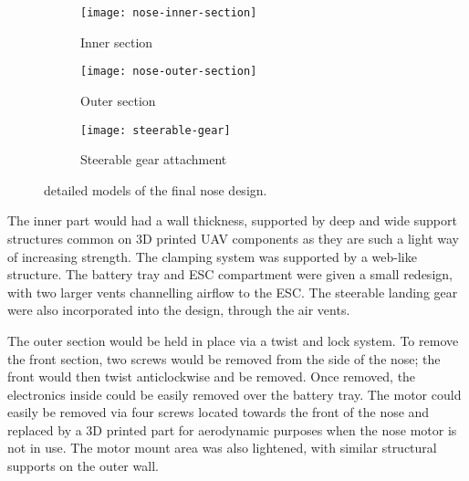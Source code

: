 \documentclass[../../main.tex]{subfiles}
\begin{document}
\begin{figure}[H]
    \centering
    \begin{subfigure}[b]{0.6\columnwidth}
        \centering
        \texttt{[image: nose-inner-section]}
        \caption{Inner section}
        \label{fig:nose-design:inner}
    \end{subfigure}
    
    \begin{subfigure}[b]{0.6\columnwidth}
        \centering
        \texttt{[image: nose-outer-section]}
        \caption{Outer section}
        \label{fig:nose-design:outer}
    \end{subfigure}

    \begin{subfigure}[b]{0.6\columnwidth}
        \centering
        \texttt{[image: steerable-gear]}
        \caption{Steerable gear attachment}
        \label{fig:nose-design:steerable-nose-gear}
    \end{subfigure}
    
    \caption{detailed models of the final nose design.}
    \label{fig:nose-design}
\end{figure} 


The inner part would had a  wall thickness, supported by  deep and  wide support structures common on 3D printed UAV components as they are such a light way of increasing strength.
The clamping system was supported by a web-like structure.
The battery tray and ESC compartment were given a small redesign, with two larger vents channelling airflow to the ESC.
The steerable landing gear were also incorporated into the design, through the air vents. 


The outer section would be held in place via a twist and lock system.
To remove the front section, two screws would be removed from the side of the nose; the front would then twist anticlockwise and be removed.
Once removed, the electronics inside could be easily removed over the battery tray.
The motor could easily be removed via four screws located towards the front of the nose and replaced by a 3D printed part for aerodynamic purposes when the nose motor is not in use.
The motor mount area was also lightened, with similar structural supports on the  outer wall. 
\end{document}
